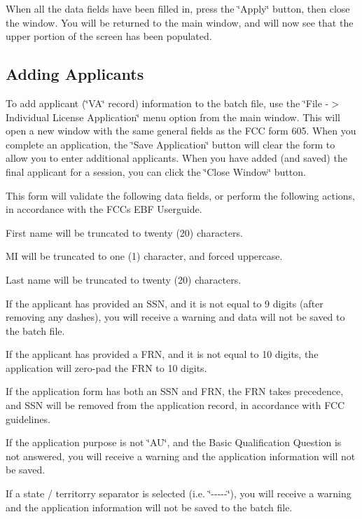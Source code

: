 When all the data fields have been filled in, press the \char`\"{}\+Apply\char`\"{} button, then close the window. You will be returned to the main window, and will now see that the upper portion of the screen has been populated.

\subsection*{Adding Applicants}

To add applicant (\char`\"{}\+V\+A\char`\"{} record) information to the batch file, use the \char`\"{}\+File -\/$>$ Individual License Application\char`\"{} menu option from the main window. This will open a new window with the same general fields as the F\+CC form 605. When you complete an application, the \char`\"{}\+Save Application\char`\"{} button will clear the form to allow you to enter additional applicants. When you have added (and saved) the final applicant for a session, you can click the \char`\"{}\+Close Window\char`\"{} button.

This form will validate the following data fields, or perform the following actions, in accordance with the F\+CC\textquotesingle{}s E\+BF Userguide.


\begin{DoxyItemize}
\item First name will be truncated to twenty (20) characters.
\item MI will be truncated to one (1) character, and forced uppercase.
\item Last name will be truncated to twenty (20) characters.
\item If the applicant has provided an S\+SN, and it is not equal to 9 digits (after removing any dashes), you will receive a warning and data will not be saved to the batch file.
\item If the applicant has provided a F\+RN, and it is not equal to 10 digits, the application will zero-\/pad the F\+RN to 10 digits.
\item If the application form has both an S\+SN and F\+RN, the F\+RN takes precedence, and S\+SN will be removed from the application record, in accordance with F\+CC guidelines.
\item If the application purpose is not \char`\"{}\+A\+U\char`\"{}, and the Basic Qualification Question is not answered, you will receive a warning and the application information will not be saved.
\item If a state / territorry separator is selected (i.\+e. \char`\"{}-\/-\/-\/-\/-\/\char`\"{}), you will receive a warning and the application information will not be saved to the batch file.
\end{DoxyItemize}

